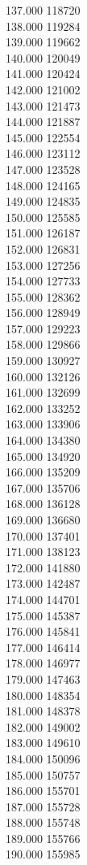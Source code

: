 { 137.000	118720 \\
 138.000	119284 \\
 139.000	119662 \\
 140.000	120049 \\
 141.000	120424 \\
 142.000	121002 \\
 143.000	121473 \\
 144.000	121887 \\
 145.000	122554 \\
 146.000	123112 \\
 147.000	123528 \\
 148.000	124165 \\
 149.000	124835 \\
 150.000	125585 \\
 151.000	126187 \\
 152.000	126831 \\
 153.000	127256 \\
 154.000	127733 \\
 155.000	128362 \\
 156.000	128949 \\
 157.000	129223 \\
 158.000	129866 \\
 159.000	130927 \\
 160.000	132126 \\
 161.000	132699 \\
 162.000	133252 \\
 163.000	133906 \\
 164.000	134380 \\
 165.000	134920 \\
 166.000	135209 \\
 167.000	135706 \\
 168.000	136128 \\
 169.000	136680 \\
 170.000	137401 \\
 171.000	138123 \\
 172.000	141880 \\
 173.000	142487 \\
 174.000	144701 \\
 175.000	145387 \\
 176.000	145841 \\
 177.000	146414 \\
 178.000	146977 \\
 179.000	147463 \\
 180.000	148354 \\
 181.000	148378 \\
 182.000	149002 \\
 183.000	149610 \\
 184.000	150096 \\
 185.000	150757 \\
 186.000	155701 \\
 187.000	155728 \\
 188.000	155748 \\
 189.000	155766 \\
 190.000	155985 \\
}
